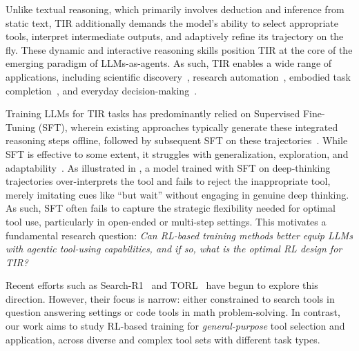 Unlike textual reasoning, which primarily involves deduction and inference from static text, TIR additionally demands the model’s ability to select appropriate tools, interpret intermediate outputs, and adaptively refine its trajectory on the fly. These dynamic and interactive reasoning skills position TIR at the core of the emerging paradigm of LLMs-as-agents. As such, TIR enables a wide range of applications, including scientific discovery~\citep{roohani2024biodiscoveryagent, inoue2024drugagent}, research automation~\citep{baek2024researchagent, wang2024autosurvey}, embodied task completion~\citep{zhang2023building, huang2023embodied}, and everyday decision-making~\citep{ye2023rational, zhai2024enhancing}.

Training LLMs for TIR tasks has predominantly relied on Supervised Fine-Tuning (SFT), wherein existing approaches typically generate these integrated reasoning steps offline, followed by subsequent SFT on these trajectories~\citep{chen2023fireact, zeng2024agenttuning, chen2024agentflan, acikgoz2025coalm}. While SFT is effective to some extent, it struggles with generalization, exploration, and adaptability~\citep{chu2025sft, guo2025deepseek}. As illustrated in , a model trained with SFT on deep-thinking trajectories over-interprets the tool and fails to reject the inappropriate tool, merely imitating cues like ``but wait'' without engaging in genuine deep thinking. As such, SFT often fails to capture the strategic flexibility needed for optimal tool use, particularly in open-ended or multi-step settings. This motivates a fundamental research question: \textit{Can RL-based training methods better equip LLMs with agentic tool-using capabilities, and if so, what is the optimal RL design for TIR?}


Recent efforts such as Search-R1~\citep{jin2025search} and TORL~\citep{li2025torl} have begun to explore this direction. However, their focus is narrow: either constrained to search tools in question answering settings or code tools in math problem-solving. In contrast, our work aims to study RL-based training for \textit{general-purpose} tool selection and application, across diverse and complex tool sets with different task types.


